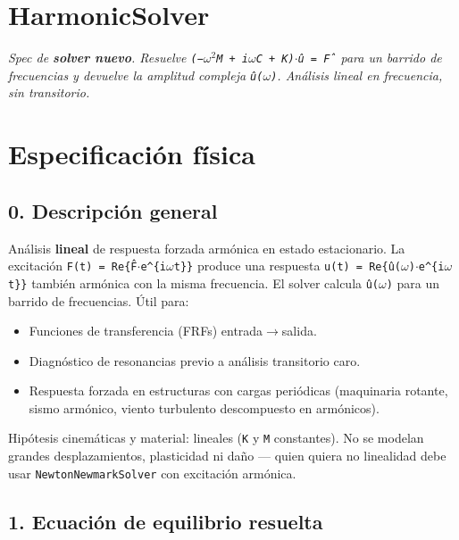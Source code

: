 \documentclass[11pt,letterpaper,oneside]{report}
\begin{document}
\section{HarmonicSolver}



\textit{Spec de \textbf{solver nuevo}. Resuelve \texttt{(−\ensuremath{\omega}\ensuremath{^{2}}M + i\ensuremath{\omega}C + K)\ensuremath{\cdot}û = F̂} para un barrido de frecuencias y devuelve la amplitud compleja \texttt{û(\ensuremath{\omega})}. Análisis lineal en frecuencia, sin transitorio.}



\section{Especificación física}

\subsection{0. Descripción general}

Análisis \textbf{lineal} de respuesta forzada armónica en estado estacionario. La excitación \texttt{F(t) = Re\{F̂\ensuremath{\cdot}e\textasciicircum{}\{i\ensuremath{\omega}t\}\}} produce una respuesta \texttt{u(t) = Re\{û(\ensuremath{\omega})\ensuremath{\cdot}e\textasciicircum{}\{i\ensuremath{\omega}t\}\}} también armónica con la misma frecuencia. El solver calcula \texttt{û(\ensuremath{\omega})} para un barrido de frecuencias. Útil para:

\begin{itemize}
  \item Funciones de transferencia (FRFs) entrada\ensuremath{\to}salida.
  \item Diagnóstico de resonancias previo a análisis transitorio caro.
  \item Respuesta forzada en estructuras con cargas periódicas (maquinaria rotante, sismo armónico, viento turbulento descompuesto en armónicos).
\end{itemize}

Hipótesis cinemáticas y material: lineales (\texttt{K} y \texttt{M} constantes). No se modelan grandes desplazamientos, plasticidad ni daño --- quien quiera no linealidad debe usar \texttt{NewtonNewmarkSolver} con excitación armónica.

\subsection{1. Ecuación de equilibrio resuelta}
\end{document}
